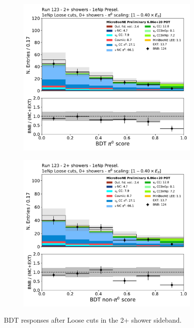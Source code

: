 \begin{figure}[H]
    \begin{center}
    \begin{subfigure}{0.45\textwidth}
    \includegraphics[width=1.00\textwidth]{Sidebands/Figures/1eNp/TwoShower/TwoPShr_NP_NPLAllShr_pi0e040/pi0_score.pdf}
    \end{subfigure}
    \begin{subfigure}{0.45\textwidth}
    \includegraphics[width=1.00\textwidth]{Sidebands/Figures/1eNp/TwoShower/TwoPShr_NP_NPLAllShr_pi0e040/nonpi0_score.pdf}
    \end{subfigure}
    \caption{\label{fig:sb:1eNp:twopshr:loose:bdt} BDT responses after \npsel Loose cuts in the 2+ shower sideband.}
    \end{center}
\end{figure}

